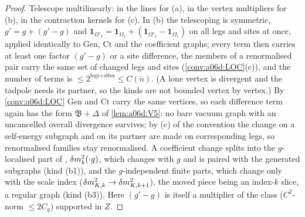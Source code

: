 \begin{proof}
Telescope multilinearly: in the lines for (a), in the vertex multipliers for (b), in the contraction kernels for (c). In (b) the telescoping is symmetric, $g'=g+(g'-g)$ and $\mathbf 1_{\Omega'_1}=\mathbf 1_{\Omega_1}+(\mathbf 1_{\Omega'_1}-\mathbf 1_{\Omega_1})$ on all legs and sites at once, applied identically to $\mathrm{Gen}$, $\mathrm{Ct}$ and the coefficient graphs; every term then carries at least one factor $(g'-g)$ or a site difference, the members of a renormalised pair carry the same set of changed legs and sites (\cref{conv:a06d:LOC}(c)), and the number of terms is $\le2^{\text{legs}+\text{sites}}\le C(\bar n)$. (A lone \cite[(1.7)]{Ba3} vertex is divergent and the \cite[(1.6)]{Ba3} tadpole needs its partner, so the kinds are not bounded vertex by vertex.) By \cref{conv:a06d:LOC} $\mathrm{Gen}$ and $\mathrm{Ct}$ carry the same vertices, so each difference term again has the form $\mathfrak B+\Delta$ of \cref{lem:a06d:V5}: no bare vacuum graph with an uncancelled overall divergence survives; by (c) of the convention the change on a self-energy subgraph and on its partner are made on corresponding legs, so renormalised families stay renormalised. A coefficient change splits into the $g$-localised part of \cite[(1.29)]{Ba3}, $\delta m^2_k(\cdot g)$, which changes with $g$ and is paired with the generated subgraphs (kind (b1)), and the $g$-independent finite parts, which change only with the scale index ($\delta m^2_{K,k}\to\delta m^2_{K,k+1}$), the moved piece being an index-$k$ slice, a regular graph (kind (b3)). Here $(g'-g)$ is itself a multiplier of the class ($C^2$-norm $\le2C_g$) supported in $Z$.
\end{proof}
